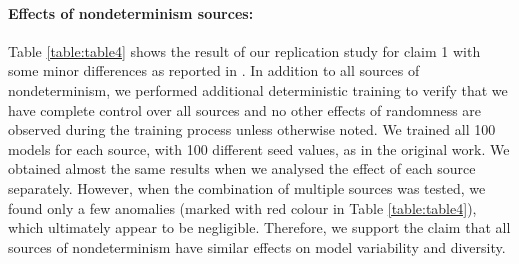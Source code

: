 \paragraph{Effects of nondeterminism sources:}
Table \ref{table:table4} shows the result of our replication study for  claim 1 with some minor differences as reported in \cite{summers2021nondeterminism}. In addition to all sources of nondeterminism, we performed additional deterministic training to verify that we have complete control over all sources and no other effects of randomness are observed during the training process unless otherwise noted. We trained all 100 models for each source, with 100 different seed values, as in the original work. We obtained almost the same results when we analysed the effect of each source separately. However, when the combination of multiple sources was tested, we found only a few anomalies (marked with red colour in Table \ref{table:table4}), which ultimately appear to be negligible. Therefore, we support the claim that all sources of nondeterminism have similar effects on model variability and diversity.
\begin{table}[!htb]
\centering
{}
	\caption{Effects of nondeterminism sources}
	\label{table:table4}
\end{table}

